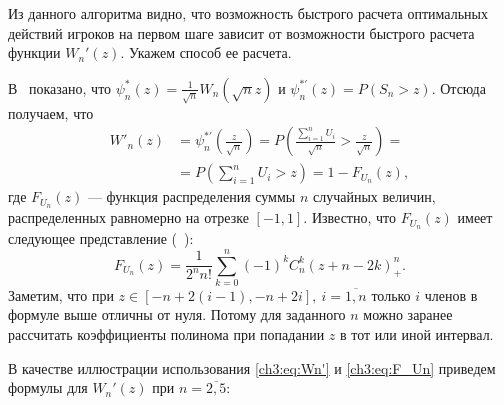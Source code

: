 {Из данного алгоритма видно, что возможность быстрого расчета оптимальных действий игроков на первом шаге зависит от возможности быстрого расчета функции $W_n'(z)$.
Укажем способ ее расчета.

В~\cite{demeyer02} показано, что $\psi^*_n(z) = \frac{1}{\sqrt{n}} W_n(\sqrt{n} z)$ и $\psi^{*\prime}_n(z) = P(S_n > z)$.
Отсюда получаем, что
\begin{equation}\label{ch3:eq:Wn'}
  \begin{aligned}
    W'_n(z)
    &= \psi^{*\prime}_n \left( \frac{z}{\sqrt{n}} \right) 
    = P\left( \frac{\sum_{i=1}^n U_i}{\sqrt{n}} > \frac{z}{\sqrt{n}} \right) = \\
    &= P\left( \sum_{i=1}^n U_i > z \right) 
    = 1 - F_{U_n}(z),
  \end{aligned}
\end{equation}
где $F_{U_n}(z)$ --- функция распределения суммы $n$ случайных величин, распределенных равномерно на отрезке $[-1, 1]$.
Известно, что $F_{U_n}(z)$ имеет следующее представление (\seename~\cite{feller67}):
\begin{equation}\label{ch3:eq:F_Un}
  F_{U_n}(z) = \frac{1}{2^n n!} \sum_{k=0}^n (-1)^k C_n^k (z + n - 2k)^n_+.
\end{equation}
Заметим, что при $z \in [-n + 2(i-1), -n + 2i],\ i = \overline{1, n}$ только $i$ членов в формуле выше отличны от нуля.
Потому для заданного $n$ можно заранее рассчитать коэффициенты полинома при попадании $z$ в тот или иной интервал.

В качестве иллюстрации использования \eqref{ch3:eq:Wn'} и \eqref{ch3:eq:F_Un} приведем формулы для $W_n'(z)$ при $n = \overline{2, 5}$:

}
